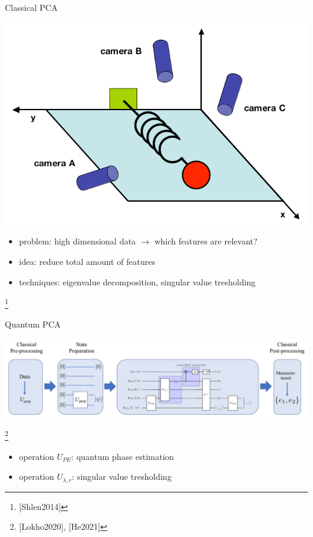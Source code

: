\begin{frame}{Classical PCA}
  \begin{minipage}{0.5\textwidth}
    \centering
    \includegraphics[width=\textwidth]{../assets/context_pca_example.png}
  \end{minipage}%
  \begin{minipage}{0.5\textwidth}
    \begin{itemize}
      \item problem: high dimensional data $\rightarrow$ which features are relevant?
      \item idea: reduce total amount of features
      \item techniques: eigenvalue decomposition, singular value tresholding
    \end{itemize}
  \end{minipage}
  \footnote{[Shlen2014]}
\end{frame}


\begin{frame}{Quantum PCA}
  \begin{minipage}{1.0\textwidth}
    \centering
    \includegraphics[width=\textwidth]{../assets/context_algorithm_main-2.png}
  \end{minipage}
  \hfill
  \footnote{[Lokho2020], [He2021]}
  \begin{minipage}{1.0\textwidth}
    \begin{itemize}
      \item operation $U_{PE}$: quantum phase estimation
      \item operation $U_{\lambda, r}$: singular value tresholding
    \end{itemize}
  \end{minipage}
\end{frame}


